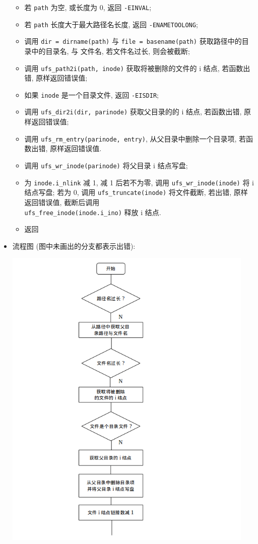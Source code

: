 \documentclass[nofonts]{ctexart}
\begin{document}
\begin{itemize}
  \begin{itemize}
  \item
    若 \texttt{path} 为空, 或长度为 0, 返回 \texttt{-EINVAL};
  \item
    若 \texttt{path} 长度大于最大路径名长度, 返回
    \texttt{-ENAMETOOLONG};
  \item
    调用 \texttt{dir = dirname(path)} 与 \texttt{file = basename(path)}
    获取路径中的目录中的目录名, 与 文件名, 若文件名过长, 则会被截断;
  \item
    调用 \texttt{ufs\_path2i(path, inode)} 获取将被删除的文件的 i 结点,
    若函数出错, 原样返回错误值;
  \item
    如果 \texttt{inode} 是一个目录文件, 返回 \texttt{-EISDIR};
  \item
    调用 \texttt{ufs\_dir2i(dir, parinode)} 获取父目录的的 i 结点,
    若函数出错, 原样返回错误值;
  \item
    调用 \texttt{ufs\_rm\_entry(parinode, entry)},
    从父目录中删除一个目录项, 若函数出错, 原样返回错误值.
  \item
    调用 \texttt{ufs\_wr\_inode(parinode)} 将父目录 i 结点写盘;
  \item
    为 \texttt{inode.i\_nlink} 减 1, 减 1 后若不为零, 调用
    \texttt{ufs\_wr\_inode(inode)} 将 i 结点写盘; 若为 0, 调用
    \texttt{ufs\_truncate(inode)} 将文件截断, 若出错, 原样返回错误值,
    截断后调用 \\
    \texttt{ufs\_free\_inode(inode.i\_ino)} 释放 i 结点.
  \item
    返回
  \end{itemize}
\item
  流程图
  (图中未画出的分支都表示出错):

  \includegraphics[width=12cm]{./images/./unlink_1.png}


\end{itemize}
\end{document}
